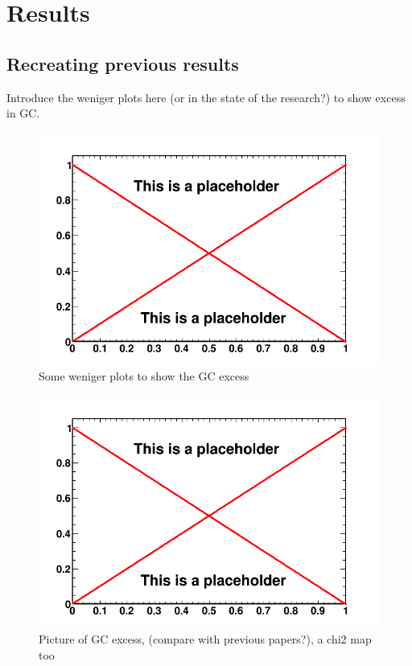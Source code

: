 \chapter{Results}
\label{ch:results}
%

\section{Recreating previous results}

Introduce the weniger plots here (or in the state of the research?) to show excess in GC.
\begin{figure}[h]
  \centering
  \includegraphics[width=.9\linewidth]{pic/dummy.png}
  \caption{Some weniger plots to show the GC excess}
  \label{fig:weniger_plot}
\end{figure}



\begin{figure}[h]
  \centering
  \includegraphics[width=.9\linewidth]{pic/dummy.png}
  \caption{Picture of GC excess, (compare with previous papers?), a chi2 map too}
  \label{fig:original_GC_excess}
\end{figure}

